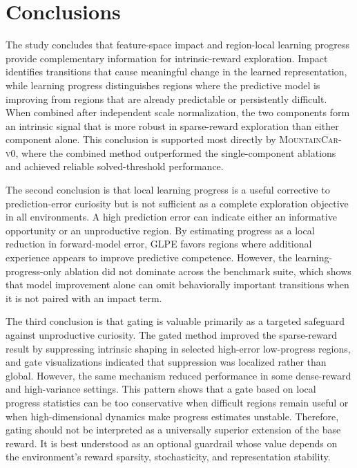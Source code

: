 \section{Conclusions}
\label{sec:conclusion_conclusions}

The study concludes that feature-space impact and region-local learning progress provide complementary information for intrinsic-reward exploration.
Impact identifies transitions that cause meaningful change in the learned representation, while learning progress distinguishes regions where the predictive model is improving from regions that are already predictable or persistently difficult.
When combined after independent scale normalization, the two components form an intrinsic signal that is more robust in sparse-reward exploration than either component alone.
This conclusion is supported most directly by \textsc{MountainCar-v0}, where the combined method outperformed the single-component ablations and achieved reliable solved-threshold performance.

The second conclusion is that local learning progress is a useful corrective to prediction-error curiosity but is not sufficient as a complete exploration objective in all environments.
A high prediction error can indicate either an informative opportunity or an unproductive region.
By estimating progress as a local reduction in forward-model error, GLPE favors regions where additional experience appears to improve predictive competence.
However, the learning-progress-only ablation did not dominate across the benchmark suite, which shows that model improvement alone can omit behaviorally important transitions when it is not paired with an impact term.

The third conclusion is that gating is valuable primarily as a targeted safeguard against unproductive curiosity.
The gated method improved the sparse-reward result by suppressing intrinsic shaping in selected high-error low-progress regions, and gate visualizations indicated that suppression was localized rather than global.
However, the same mechanism reduced performance in some dense-reward and high-variance settings.
This pattern shows that a gate based on local progress statistics can be too conservative when difficult regions remain useful or when high-dimensional dynamics make progress estimates unstable.
Therefore, gating should not be interpreted as a universally superior extension of the base reward.
It is best understood as an optional guardrail whose value depends on the environment's reward sparsity, stochasticity, and representation stability.

